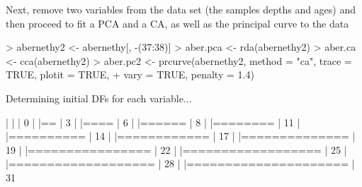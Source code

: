 \documentclass[a4paper,10pt]{article}
\begin{document}
Next, remove two variables from the data set (the samples depths and ages) and
then proceed to fit a PCA and a CA, as well as the principal curve to the data
\begin{Schunk}
\begin{Sinput}
> abernethy2 <- abernethy[, -(37:38)]
> aber.pca <- rda(abernethy2)
> aber.ca <- cca(abernethy2)
> aber.pc2 <- prcurve(abernethy2, method = "ca", trace = TRUE, plotit = TRUE,
+                     vary = TRUE, penalty = 1.4)
\end{Sinput}
\begin{Soutput}
   Determining initial DFs for each variable...

  |                                                                            
  |                                                                      |   0%
  |                                                                            
  |==                                                                    |   3%
  |                                                                            
  |====                                                                  |   6%
  |                                                                            
  |======                                                                |   8%
  |                                                                            
  |========                                                              |  11%
  |                                                                            
  |==========                                                            |  14%
  |                                                                            
  |============                                                          |  17%
  |                                                                            
  |==============                                                        |  19%
  |                                                                            
  |================                                                      |  22%
  |                                                                            
  |==================                                                    |  25%
  |                                                                            
  |===================                                                   |  28%
  |                                                                            
  |=====================                                                 |  31%

\end{Soutput}
\end{Schunk}
\end{document}
